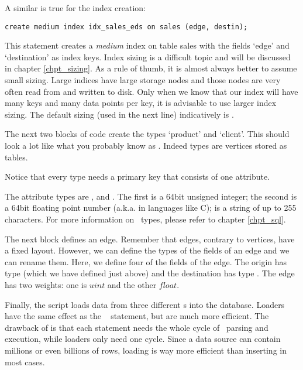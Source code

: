 A similar is true for the index creation:

\begin{sqlcode}
\begin{lstlisting}
create medium index idx_sales_eds on sales (edge, destin);
\end{lstlisting}
\end{sqlcode}

This statement creates a \emph{medium} index on table sales
with the fields `edge' and `destination' as index keys.
Index sizing is a difficult topic and will be discussed
in chapter \ref{chpt_sizing}.
As a rule of thumb, it is almost always better to assume
small sizing. Large indices have large storage nodes
and those nodes are very often read from and written
to disk. Only when we know that our index will have
many keys and many data points per key, it is advisable
to use larger index sizing. The default sizing (used in the next
line) indicatively is .

The next two blocks of code create the types
`product' and `client'. This should look a lot like
what you probably know as . Indeed types
are vertices stored as  tables.

Notice that every type needs a primary key that consists
of one attribute.

The attribute types are ,  and .
The first is a 64bit unsigned integer;
the second is a 64bit floating point number
(a.k.a.  in languages like C);
 is a string of up to 255  characters.
For more information on \sql\ types, please refer to chapter
\ref{chpt_sql}.

The next block defines an edge. Remember
that edges, contrary to vertices, have a fixed layout.
However, we can define the types of the fields of an edge
and we can rename them. 
Here, we define four of the fields of the edge.
The origin has type  (which we have defined just above)
and the destination has type .
The edge has two weights: one is $uint$ and the other $float$.

Finally, the script loads data from three different s
into the database. Loaders have the same effect as the \sql\
 statement, but are much more efficient.
The drawback of \term{insert} is that each statement
needs the whole cycle of \sql\ parsing and execution,
while loaders only need one cycle. Since a data source
can contain millions or even billions of rows,
loading is way more efficient than inserting in most cases.

